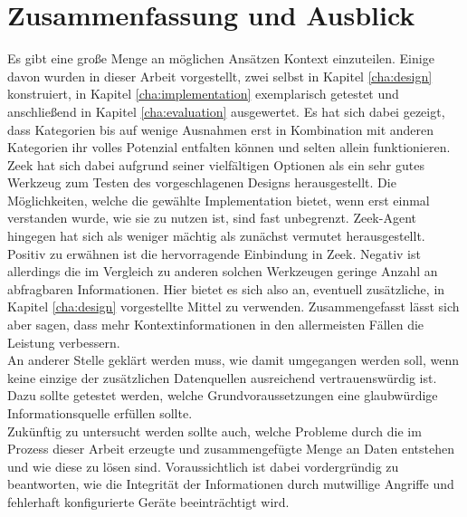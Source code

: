 \chapter{Zusammenfassung und Ausblick}%
\label{cha:conclusion}


Es gibt eine große Menge an möglichen Ansätzen Kontext einzuteilen. Einige davon wurden in dieser Arbeit vorgestellt, zwei selbst in Kapitel \ref{cha:design} konstruiert, in Kapitel \ref{cha:implementation} exemplarisch getestet und anschließend in Kapitel \ref{cha:evaluation} ausgewertet. Es hat sich dabei gezeigt, dass Kategorien bis auf wenige Ausnahmen erst in Kombination mit anderen Kategorien ihr volles Potenzial entfalten können und selten allein funktionieren. Zeek hat sich dabei aufgrund seiner vielfältigen Optionen als ein sehr gutes Werkzeug zum Testen des vorgeschlagenen Designs herausgestellt. Die Möglichkeiten, welche die gewählte Implementation bietet, wenn erst einmal verstanden wurde, wie sie zu nutzen ist, sind fast unbegrenzt. Zeek-Agent hingegen hat sich als weniger mächtig als zunächst vermutet herausgestellt. Positiv zu erwähnen ist die hervorragende Einbindung in Zeek. Negativ ist allerdings die im Vergleich zu anderen solchen Werkzeugen geringe Anzahl an abfragbaren Informationen. Hier bietet es sich also an, eventuell zusätzliche, in Kapitel \ref{cha:design} vorgestellte Mittel zu verwenden. Zusammengefasst lässt sich aber sagen, dass mehr Kontextinformationen in den allermeisten Fällen die Leistung verbessern.\\
An anderer Stelle geklärt werden muss, wie damit umgegangen werden soll, wenn keine einzige der zusätzlichen Datenquellen ausreichend vertrauenswürdig ist. Dazu sollte getestet werden, welche Grundvoraussetzungen eine glaubwürdige Informationsquelle erfüllen sollte.\\
Zukünftig zu untersucht werden sollte auch, welche Probleme durch die im Prozess dieser Arbeit erzeugte und zusammengefügte Menge an Daten entstehen und wie diese zu lösen sind. 
Voraussichtlich ist dabei vordergründig zu beantworten, wie die Integrität der Informationen durch mutwillige Angriffe und fehlerhaft konfigurierte Geräte beeinträchtigt wird.\\
